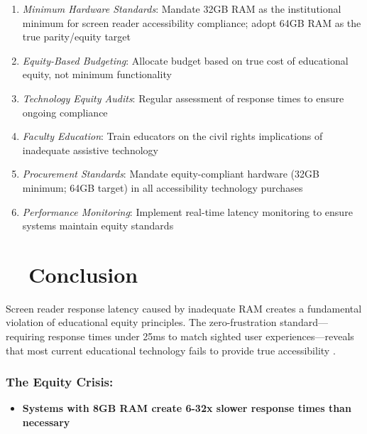 \begin{enumerate}
	\item \emph{Minimum Hardware Standards}: Mandate 32GB RAM as the institutional minimum for screen reader accessibility compliance; adopt 64GB RAM as the true parity/equity target \supercite{EducationalEquityReport2024}
	\item \emph{Equity-Based Budgeting}: Allocate budget based on true cost of educational equity, not minimum functionality \supercite{EquityInFundingEducation}
	\item \emph{Technology Equity Audits}: Regular assessment of response times to ensure ongoing compliance \supercite{TechnologyAccessibilityAudits}
	\item \emph{Faculty Education}: Train educators on the civil rights implications of inadequate assistive technology \supercite{AccessibilityTrainingEducation}
	\item \emph{Procurement Standards}: Mandate equity-compliant hardware (32GB minimum; 64GB target) in all accessibility technology purchases \supercite{AccessibleProcurementGuidelines}
	\item \emph{Performance Monitoring}: Implement real-time latency monitoring to ensure systems maintain equity standards \supercite{SystemPerformanceMonitoring}
\end{enumerate}

\section{~~Conclusion}\label{chapter1-conclusion}

Screen reader response latency caused by inadequate RAM creates a fundamental violation of educational equity principles. The zero-frustration standard—requiring response times under 25ms to match sighted user experiences—reveals that most current educational technology fails to provide true accessibility \supercite{EducationalEquityReport2024, W3C2018WCAG21}.

\subsubsection{The Equity Crisis:}

\begin{itemize}
	\item \textbf{Systems with 8GB RAM create 6-32x slower response times than necessary} \supercite{EducationalEquityReport2024}
\end{itemize}
